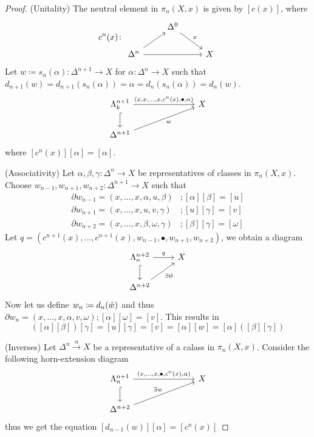 \begin{proof}
    (Unitality) The neutral element in $\pi_n(X,x)$ is given by $[c(x)]$, where 
    \[
    c^n(x)\colon 
    \begin{tikzcd}
        &
        \Delta^0
        \ar[rd, "x"]
        &
        \\
        \Delta^n
        \ar[ru]
        \ar[rr]
        &&
        X
    \end{tikzcd}
    \]
    Let $w\coloneqq s_n(\alpha) \colon \Delta^{n+1} \to X$ for $\alpha\colon \Delta^n \to X$ such that $d_{n+1}(w)=d_{n+1}(s_n(\alpha))=\alpha=d_n(s_n(\alpha))=d_n(w)$.
    \[
    \begin{tikzcd}
        \Lambda_k^{n+1}
        \ar[d, hook]
        \ar[rrr, "{(x,x,\dotsc,x,c^n(x), \bullet, \alpha)}"]
        &&&
        X
        \\
        \Delta^{n+1}
        \ar[rrru, "w"']
    \end{tikzcd}
    \]
    where $[c^n(x)][\alpha]=[\alpha]$.

    (Associativity)
    Let $\alpha, \beta, \gamma \colon \Delta^n \to X$ be representatives of classes in $\pi_n(X,x)$.
    Choose $w_{n-1},w_{n+1},w_{n+2}\colon \Delta^{n+1} \to X$ such that 
    \begin{align*}
        \partial w_{n-1} =(x, \dotsc, x, \alpha, u, \beta) &; [\alpha][\beta]=[u]\\
        \partial w_{n+1} =(x, \dotsc, x, u, v, \gamma) &; [u][\gamma]=[v]\\
        \partial w_{n+2} =(x, \dotsc, x, \beta, \omega, \gamma) &; [\beta][\gamma]=[\omega]
    \end{align*}
    Let $q=(c^{n+1}(x), \dotsc , c^{n+1}(x), w_{n-1}, \bullet, w_{n+1}, w_{n+2})$, we obtain a diagram
    \[
    \begin{tikzcd}
        \Lambda_n^{n+2}
        \ar[r, "q"]
        \ar[d, hook]
        &
        X
        \\
        \Delta^{n+2}
        \ar[ru, " \exists \Tilde{w}"']
    \end{tikzcd}
    \]
    Now let us define $w_n \coloneqq d_n(\Tilde{w})$ and thus $\partial w_n = (x, \dotsc , x , \alpha, v, \omega) ; [\alpha][\omega]=[v]$. This results in 
    \[
    ([\alpha][\beta])[\gamma]=[u][\gamma]=[v]=[\alpha][w]=[\alpha]([\beta][\gamma])
    \]
    
    (Inverses)
    Let $\Delta^n \xrightarrow{\alpha} X$ be a representative of a calass in $\pi_n(X,x)$. 
    Consider the following horn-extension diagram
    \[
    \begin{tikzcd}
        \Lambda_n^{n+1}
        \ar[rrr, "{(x, \dotsc , x , \bullet , c^n(x), \alpha)}"]
        \arrow[d, hook]
        &&&
        X
        \\
        \Delta^{n+2}
        \ar[rrru, " \exists w"]
    \end{tikzcd}
    \]
    thus we get the equation $[d_{n-1}(w)][\alpha]=[c^n(x)]$


\end{proof}
